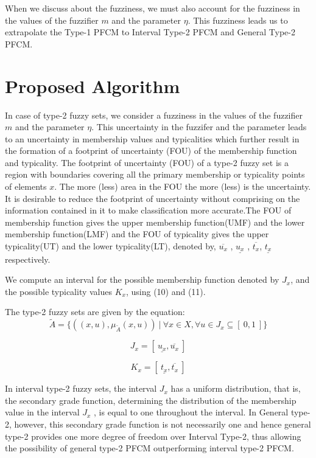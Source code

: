 \documentclass[journal, onecolumn]{IEEEtran}
\begin{document}
When we discuss about the fuzziness, we must also account for the fuzziness in the values of the fuzzifier $m$ and the parameter $\eta$. This fuzziness leads us to extrapolate the Type-1 PFCM to Interval Type-2 PFCM and General Type-2 PFCM. 

\section{Proposed Algorithm}


In case of type-2 fuzzy sets, we consider a fuzziness in the values of the fuzzifier $m$ and the parameter $\eta$. This uncertainty in the fuzzifer and the parameter leads to an uncertainty in membership values and typicalities which further result in the formation of a footprint of uncertainty (FOU) of the membership function and typicality. The footprint of uncertainty (FOU) of a type-2 fuzzy set is a region with boundaries covering all the primary membership or typicality points of elements $x$. The more (less) area in the FOU the more (less) is the uncertainty. It is desirable to reduce the footprint of uncertainty without comprising on the information contained in it to make classification more accurate.The FOU of membership function gives the upper membership function(UMF) and the lower membership function(LMF) and the FOU of typicality gives the upper typicality(UT) and the lower typicality(LT), denoted by, $\overline{u_x}$ , $\underline{u_x}$ , $\overline{t_x}$, $\underline{t_x}$ respectively.

We compute an interval for the possible membership function denoted by $J_x$, and the possible typicality values $K_x$, using (10) and (11). 


The type-2 fuzzy sets are given by the equation: 
\begin{equation}
\tilde{A}= {\{ ((x,u),\mu_{\tilde{A}}(x,u))\: | \: \forall x \in X, \forall u \in J_x \subseteq [\: 0,1 \:]  \}}
\end{equation}



\begin{equation}
J_x=[\: \underline{u_x},\overline{u_x} \:]
\end{equation}

\begin{equation}
K_x=[\: \underline{t_x},\overline{t_x} \:]
\end{equation}


In interval type-2 fuzzy sets, the interval $J_x$ has a uniform distribution, that is, the secondary grade function, determining the distribution of the membership value in the interval $J_x$ , is equal to one throughout the interval. In General type-2, however, this secondary grade function is not necessarily one and hence general type-2 provides one more degree of freedom over Interval Type-2, thus allowing the possibility of general type-2 PFCM outperforming interval type-2  PFCM.
\end{document}
